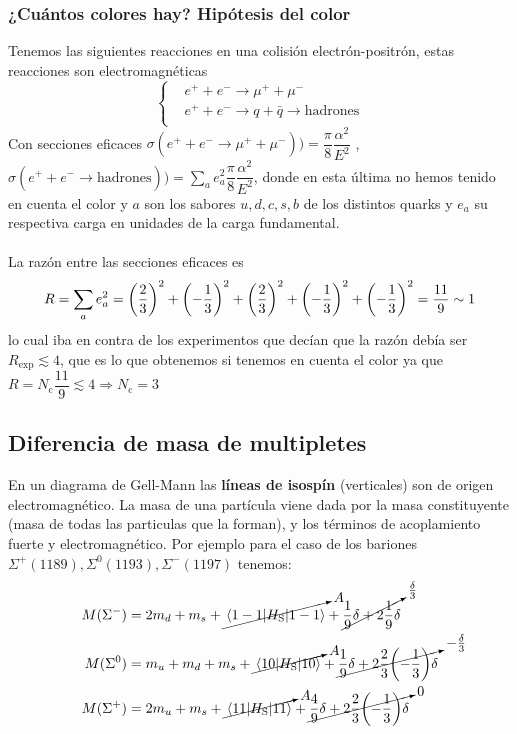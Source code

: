 \subsubsection{¿Cuántos colores hay? Hipótesis del color}
Tenemos las siguientes reacciones en una colisión electrón-positrón, estas reacciones son electromagnéticas
\begin{equation*}
    \left \{ \begin{aligned}
         &e^++e^-\longrightarrow \mu^++\mu^- \\
         &e^++e^-\longrightarrow q+\bar{q} \xrightarrow[]{} \text{hadrones}
    \end{aligned} \right.
\end{equation*}
Con secciones eficaces $\sigma(e^++e^- \xrightarrow[]{} \mu^++\mu^-))=\dfrac{\pi}{8}\dfrac{\alpha^2}{E^2}$ , $\sigma(e^++e^- \xrightarrow[]{} \text{hadrones}))= \displaystyle\sum_a e^2_a\dfrac{\pi}{8}\dfrac{\alpha^2}{E^2}$, donde en esta última no hemos tenido en cuenta el color y $a$ son los sabores $u,d,c,s,b$ de los distintos quarks y $e_a$ su respectiva carga en unidades de la carga fundamental.\\\\
 La razón entre las secciones eficaces es $$R=\sum_a e^2_a=\qty(\dfrac{2}{3})^2+\qty(-\dfrac{1}{3})^2+\qty(\dfrac{2}{3})^2+\qty(-\dfrac{1}{3})^2+\qty(-\dfrac{1}{3})^2=\dfrac{11}{9}\sim 1$$ lo cual iba en contra de los experimentos que decían que la razón debía ser $R_\text{exp}\lesssim 4$, que es lo que obtenemos si tenemos en cuenta el color ya que $R=N_\mathrm{c} \dfrac{11}{9} \lesssim 4 \Rightarrow N_\mathrm{c}=3$
 \subsection{Diferencia de masa de multipletes}
  En un diagrama de Gell-Mann las \textbf{líneas de isospín} (verticales) son de origen electromagnético. La masa de una partícula viene dada por la masa constituyente (masa de todas las particulas que la forman), y los términos de acoplamiento fuerte y electromagnético. Por ejemplo para el caso de los bariones $\Sigma^+(1189),\Sigma^0 (1193), \Sigma^-(1197)$ tenemos:
\begin{equation*}
\begin{aligned}
    M(\Sigma^-) &= 2m_d + m_s + \cancelto{A}{\mel{1 -1}{H_\mathrm{S}}{1 -1}} + \cancelto{\frac{\delta}{3}}{\dfrac{1}{9}\delta + 2 \dfrac{1}{9}\delta} \\
    M(\Sigma^0) &= m_u + m_d + m_s + \cancelto{A}{\mel{1 0}{H_\mathrm{S}}{1 0}} + \cancelto{-\frac{\delta}{3}}{\dfrac{1}{9}\delta + 2 \dfrac{2}{3} \qty(-\dfrac{1}{3}) \delta} \\
    M(\Sigma^+) &= 2m_u + m_s +\cancelto{A}{\mel{1 1}{H_\mathrm{S}}{1 1}} + \cancelto{0}{\dfrac{4}{9}\delta + 2 \dfrac{2}{3} \qty(-\dfrac{1}{3}) \delta}
\end{aligned}
\end{equation*}

